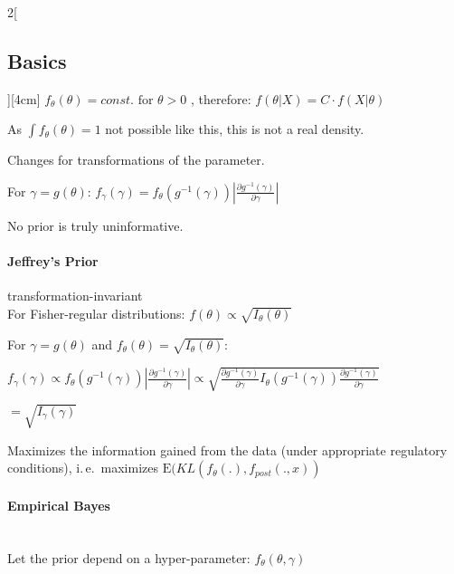 \documentclass[8pt]{extarticle}
\begin{document}
\begin{multicols}{2}[\subsection{Basics}][4cm]
\noindent $f_\theta(\theta)=const. \text{ for } \theta > 0$
,  therefore:
 $f(\theta | X) = C \cdot f(X | \theta )$

\noindent As $\int f_\theta(\theta) =1$ not possible like this, this is not a real density.

\noindent Changes for transformations of the parameter.

\begin{Proof}

\vspace{-2.3em}
\centering
For $\gamma = g(\theta)$: $f_\gamma(\gamma)=f_\theta(g^{-1}(\gamma))\left|\frac{\partial g^{-1}(\gamma)}{\partial \gamma}\right|$
\end{Proof}

 \noindent No prior is truly uninformative.


\paragraph{Jeffrey's Prior} transformation-invariant  \\

\noindent For Fisher-regular distributions: $f(\theta) \propto \sqrt{I_\theta(\theta)}$

\begin{Proof}
For $\gamma = g(\theta)$ and $f_\theta(\theta) = \sqrt{I_\theta(\theta)}$:

\noindent $f_\gamma(\gamma)  \propto f_\theta(g^{-1}(\gamma))\left|\frac{\partial g^{-1}(\gamma)}{\partial \gamma}\right| \propto \sqrt{\frac{\partial g^{-1}(\gamma)}{\partial \gamma}  I_\theta(g^{-1}(\gamma)) \frac{\partial g^{-1}(\gamma)}{\partial \gamma}}$ 

\raggedleft
$ = \sqrt{I_\gamma(\gamma)}$
\end{Proof}

\noindent\begin{minipage}{\dimexpr\linewidth}
\raggedright
Maximizes the information gained from the data (under appropriate regulatory conditions), i.\,e.\ maximizes $\mathrm{E}(KL(f_\theta(.), f_{post}(.,x))$
\end{minipage}

\paragraph{Empirical Bayes} \ \\

\noindent Let the prior depend on a hyper-parameter: $f_\theta(\theta,\gamma)$


\end{multicols}
\end{document}
